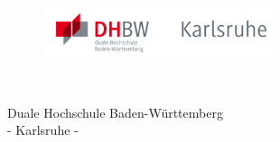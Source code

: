 


%


\thispagestyle{empty}


\begin{figure}[t]
 \centering
 \includegraphics[width=0.6\textwidth]{abb/logo1}
\end{figure}


\begin{verbatim}


\end{verbatim}

\begin{center}
\Large{Duale Hochschule Baden-Württemberg}\\
\Large{- Karlsruhe -}\\
\end{center}



